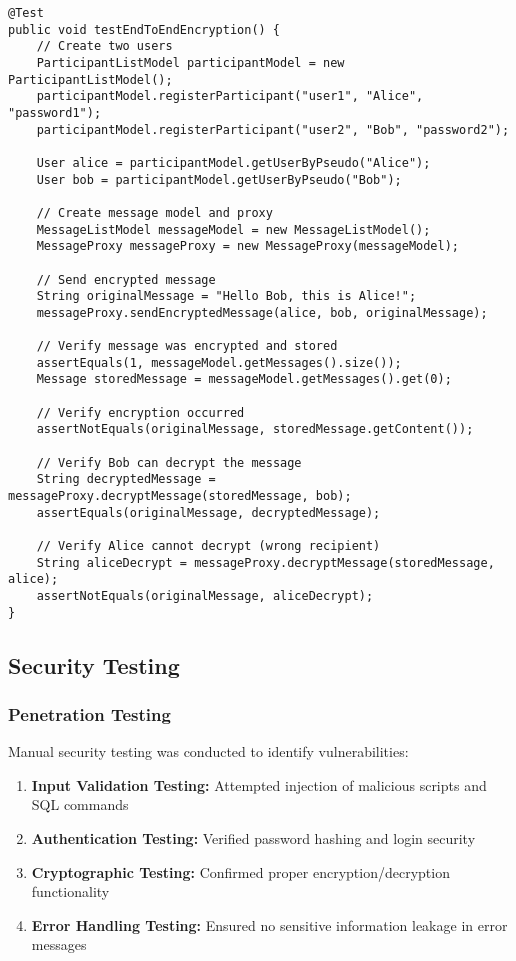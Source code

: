 \documentclass[12pt,a4paper]{article}
\begin{document}
\begin{lstlisting}[caption=Integration Test Example]
@Test
public void testEndToEndEncryption() {
    // Create two users
    ParticipantListModel participantModel = new ParticipantListModel();
    participantModel.registerParticipant("user1", "Alice", "password1");
    participantModel.registerParticipant("user2", "Bob", "password2");

    User alice = participantModel.getUserByPseudo("Alice");
    User bob = participantModel.getUserByPseudo("Bob");

    // Create message model and proxy
    MessageListModel messageModel = new MessageListModel();
    MessageProxy messageProxy = new MessageProxy(messageModel);

    // Send encrypted message
    String originalMessage = "Hello Bob, this is Alice!";
    messageProxy.sendEncryptedMessage(alice, bob, originalMessage);

    // Verify message was encrypted and stored
    assertEquals(1, messageModel.getMessages().size());
    Message storedMessage = messageModel.getMessages().get(0);

    // Verify encryption occurred
    assertNotEquals(originalMessage, storedMessage.getContent());

    // Verify Bob can decrypt the message
    String decryptedMessage = messageProxy.decryptMessage(storedMessage, bob);
    assertEquals(originalMessage, decryptedMessage);

    // Verify Alice cannot decrypt (wrong recipient)
    String aliceDecrypt = messageProxy.decryptMessage(storedMessage, alice);
    assertNotEquals(originalMessage, aliceDecrypt);
}
\end{lstlisting}

\subsection{Security Testing}

\subsubsection{Penetration Testing}

Manual security testing was conducted to identify vulnerabilities:

\begin{enumerate}
    \item \textbf{Input Validation Testing:} Attempted injection of malicious scripts and SQL commands
    \item \textbf{Authentication Testing:} Verified password hashing and login security
    \item \textbf{Cryptographic Testing:} Confirmed proper encryption/decryption functionality
    \item \textbf{Error Handling Testing:} Ensured no sensitive information leakage in error messages
\end{enumerate}
\end{document}
